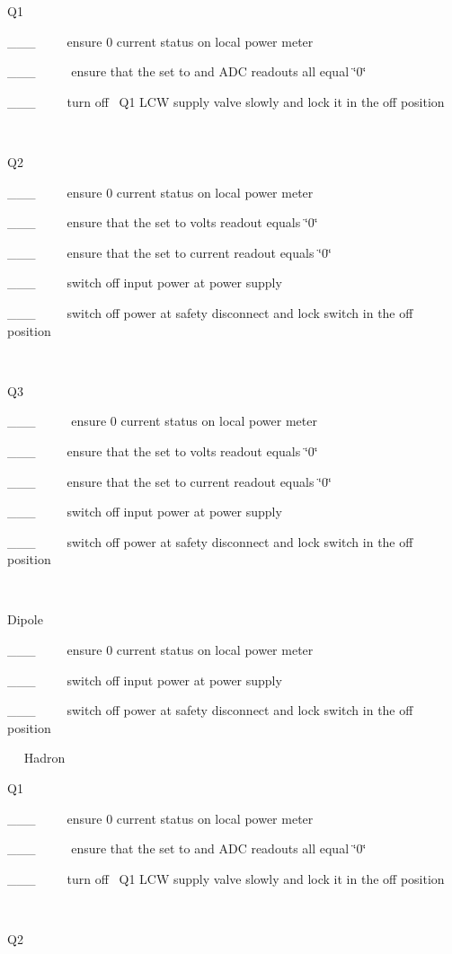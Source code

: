 Q1

\_\_\_~~~~~ensure 0 current status on local power meter 

\_\_\_~~~~~ ensure that the set to and ADC readouts all equal \char`\"{}0\char`\"{} 

\_\_\_~~~~~turn off~ Q1 LCW supply valve slowly and lock it in the off position

~

Q2

\_\_\_~~~~~ensure 0 current status on local power meter 

\_\_\_~~~~~ensure that the set to volts readout equals \char`\"{}0\char`\"{}

\_\_\_~~~~~ensure that the set to current readout equals \char`\"{}0\char`\"{}

\_\_\_~~~~~switch off input power at power supply

\_\_\_~~~~~switch off power at safety disconnect and lock switch in the off
position

~

Q3

\_\_\_~~~~~ ensure 0 current status on local power meter 

\_\_\_~~~~~ensure that the set to volts readout equals \char`\"{}0\char`\"{}

\_\_\_~~~~~ensure that the set to current readout equals \char`\"{}0\char`\"{}

\_\_\_~~~~~switch off input power at power supply

\_\_\_~~~~~switch off power at safety disconnect and lock switch in the off
position

~

Dipole

\_\_\_~~~~~ensure 0 current status on local power meter 

\_\_\_~~~~~switch off input power at power supply

\_\_\_~~~~~switch off power at safety disconnect and lock switch in the off
position

~~
Hadron

Q1

\_\_\_~~~~~ensure 0 current status on local power meter 

\_\_\_~~~~~ ensure that the set to and ADC readouts all equal \char`\"{}0\char`\"{} 

\_\_\_~~~~~turn off~ Q1 LCW supply valve slowly and lock it in the off position

~

Q2

